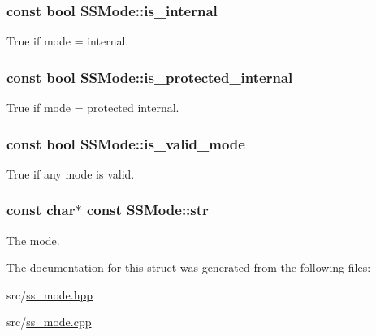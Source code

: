 \subsubsection[{\texorpdfstring{is\+\_\+internal}{is_internal}}]{\setlength{\rightskip}{0pt plus 5cm}const bool S\+S\+Mode\+::is\+\_\+internal}\hypertarget{struct_s_s_mode_a41f40fbedf3fd89f1422b27cb9a63a42}{}\label{struct_s_s_mode_a41f40fbedf3fd89f1422b27cb9a63a42}


True if mode = internal. 

\subsubsection[{\texorpdfstring{is\+\_\+protected\+\_\+internal}{is_protected_internal}}]{\setlength{\rightskip}{0pt plus 5cm}const bool S\+S\+Mode\+::is\+\_\+protected\+\_\+internal}\hypertarget{struct_s_s_mode_a5c433033fb441d73f71a4bb3779774e2}{}\label{struct_s_s_mode_a5c433033fb441d73f71a4bb3779774e2}


True if mode = protected internal. 

\subsubsection[{\texorpdfstring{is\+\_\+valid\+\_\+mode}{is_valid_mode}}]{\setlength{\rightskip}{0pt plus 5cm}const bool S\+S\+Mode\+::is\+\_\+valid\+\_\+mode}\hypertarget{struct_s_s_mode_aa6039b890f5475f03fc14efb2bc143c9}{}\label{struct_s_s_mode_aa6039b890f5475f03fc14efb2bc143c9}


True if any mode is valid. 

\subsubsection[{\texorpdfstring{str}{str}}]{\setlength{\rightskip}{0pt plus 5cm}const char$\ast$ const S\+S\+Mode\+::str}\hypertarget{struct_s_s_mode_a82376c7c47401dc851ea16b1b35cd4b7}{}\label{struct_s_s_mode_a82376c7c47401dc851ea16b1b35cd4b7}


The mode. 



The documentation for this struct was generated from the following files\+:\begin{DoxyCompactItemize}
\item 
src/\hyperlink{ss__mode_8hpp}{ss\+\_\+mode.\+hpp}\item 
src/\hyperlink{ss__mode_8cpp}{ss\+\_\+mode.\+cpp}\end{DoxyCompactItemize}

